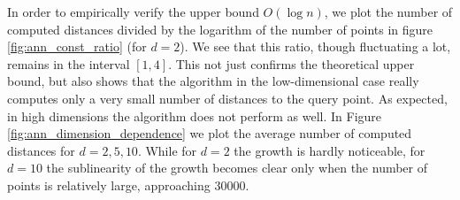 \documentclass[a4paper,USenglish]{socg-lipics-v2018}
\newcommand{\eps}{\varepsilon}
\newcommand{\dist}{\delta}
\begin{document}
In order to empirically verify the upper bound $O(\log n)$,
we plot the number of computed distances divided
by the logarithm of the number of points in figure \ref{fig:ann_const_ratio} (for $d = 2$).
We see that this ratio, though fluctuating a lot, remains in the interval $[1,4]$. This not just confirms
the theoretical upper bound, but also shows that the algorithm in the low-dimensional case
really computes only a very small number of distances to the query point.
As expected, in high dimensions the algorithm does not perform as well.
In Figure \ref{fig:ann_dimension_dependence} we plot the average number of computed distances
for $d = 2, 5, 10$. While for $d = 2$ the growth is hardly noticeable, for $d = 10$
the sublinearity of the growth becomes clear only when the number of points is relatively large,
approaching 30000.






\end{document}
